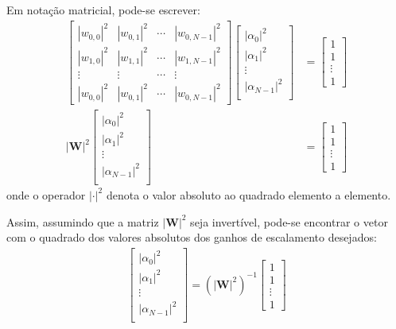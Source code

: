 Em notação matricial, pode-se escrever:
\begin{align}
\left[ 
\begin{array}{cccc}
\left| w_{0,0} \right|^2 & \left| w_{0,1} \right|^2 & \cdots & \left| w_{0,N-1} \right|^2\\
\left| w_{1,0} \right|^2 & \left| w_{1,1} \right|^2 & \cdots & \left| w_{1,N-1} \right|^2\\
\vdots & \vdots & \cdots & \vdots\\
\left| w_{0,0} \right|^2 & \left| w_{0,1} \right|^2 & \cdots & \left| w_{0,N-1} \right|^2
\end{array}
\right]
\left[ 
\begin{array}{c}
\left| \alpha_0 \right|^2\\
\left| \alpha_1 \right|^2\\
\vdots \\
\left| \alpha_{N-1} \right|^2\\
\end{array}
\right]
&=
\left[ 
\begin{array}{c}
1\\
1\\
\vdots \\
1
\end{array}
\right]\\
\left| \mathbf{W} \right|^2
\left[ 
\begin{array}{c}
\left| \alpha_0 \right|^2\\
\left| \alpha_1 \right|^2\\
\vdots \\
\left| \alpha_{N-1} \right|^2\\
\end{array}
\right]
&=
\left[ 
\begin{array}{c}
1\\
1\\
\vdots \\
1
\end{array}
\right]
\end{align}
onde o operador $\left| \cdot \right|^2$ denota o valor absoluto ao quadrado elemento a elemento.

Assim, assumindo que a matriz $\left| \mathbf{W} \right|^2$ seja invertível, pode-se encontrar o vetor com o quadrado dos valores absolutos dos ganhos de escalamento desejados:
\begin{align}
\left[ 
\begin{array}{c}
\left| \alpha_0 \right|^2\\
\left| \alpha_1 \right|^2\\
\vdots \\
\left| \alpha_{N-1} \right|^2\\
\end{array}
\right]
 = \left( \left| \mathbf{W} \right|^2 \right)^{-1}
\left[ 
\begin{array}{c}
1\\
1\\
\vdots \\
1
\end{array}
\right]
\label{eq:solucao_alpha_quadrado}
\end{align}

